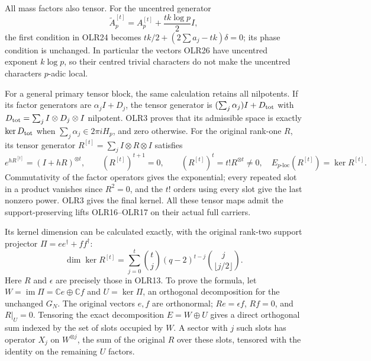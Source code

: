 All mass factors also tensor. For the uncentred generator
\[
\widetilde A_p^{[t]}=A_p^{[t]}+\frac{tk\log p}{2}I,
\tag{OLR27}
\]
the first condition in OLR24 becomes
$tk/2+(2\sum a_j-tk)\delta=0$; its phase condition is unchanged.
In particular the vectors OLR26 have uncentred exponent
$k\log p$, so their centred trivial characters do not make
the uncentred characters $p$-adic local.

For a general primary tensor block, the same calculation retains
all nilpotents. If its factor generators are $\alpha_jI+D_j$,
the tensor generator is $(\sum_j\alpha_j)I+D_{\rm tot}$ with
$D_{\rm tot}=\sum_jI\otimes D_j\otimes I$ nilpotent.
OLR3 proves that its admissible space is exactly $\ker D_{\rm tot}$
when $\sum_j\alpha_j\in2\pi iH_p$, and zero otherwise.
For the original rank-one $R$, its tensor generator
$R^{[t]}=\sum_jI\otimes R\otimes I$ satisfies
\[
e^{hR^{[t]}}=(I+hR)^{\otimes t},\qquad
(R^{[t]})^{t+1}=0,\qquad
(R^{[t]})^t=t!R^{\otimes t}\ne0,
\quad E_{p\text{-loc}}(R^{[t]})=\ker R^{[t]}.
\tag{OLR28}
\]
Commutativity of the factor operators gives the exponential;
every repeated slot in a product vanishes since $R^2=0$, and
the $t!$ orders using every slot give the last nonzero power.
OLR3 gives the final kernel. All these tensor maps admit the
support-preserving lifts OLR16--OLR17 on their actual full carriers.

Its kernel dimension can be calculated exactly, with the original
rank-two support projector $\Pi=ee^\dagger+ff^\dagger$:
\[
\boxed{
\dim\ker R^{[t]}
=\sum_{j=0}^t\binom tj(q-2)^{t-j}
                         \binom{j}{\lfloor j/2\rfloor}.}
\tag{OLR29}
\]
Here $R$ and $\epsilon$ are precisely those in OLR13.
To prove the formula, let $W=\operatorname{im}\Pi=\mathbb Ce\oplus
\mathbb Cf$ and $U=\ker\Pi$, an orthogonal decomposition for
the unchanged $G_N$. The original vectors $e,f$ are orthonormal;
$Re=\epsilon f$, $Rf=0$, and $R|_U=0$.
Tensoring the exact decomposition $E=W\oplus U$ gives a direct
orthogonal sum indexed by the set of slots occupied by $W$.
A sector with $j$ such slots has operator $X_j$ on $W^{\otimes j}$,
the sum of the original $R$ over these slots, tensored with the
identity on the remaining $U$ factors.

